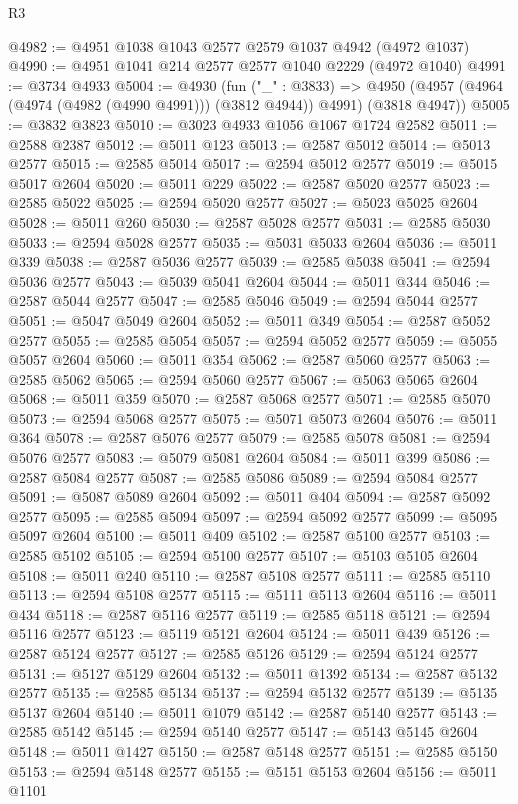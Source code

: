 \begin{lexlean}{R3}
\begin{coremodule}
@4982 := @4951 @1038 @1043 @2577 @2579 @1037 @4942 (@4972 @1037)
@4990 := @4951 @1041 @214 @2577 @2577 @1040 @2229 (@4972 @1040)
@4991 := @3734 @4933
@5004 := @4930
    (fun ("_" : @3833) =>
    @4950 (@4957 (@4964 (@4974 (@4982 (@4990 @4991))) (@3812 @4944)) @4991) (@3818 @4947))
@5005 := @3832 @3823
@5010 := @3023 @4933 @1056 @1067 @1724 @2582
@5011 := @2588 @2387
@5012 := @5011 @123
@5013 := @2587 @5012
@5014 := @5013 @2577
@5015 := @2585 @5014
@5017 := @2594 @5012 @2577
@5019 := @5015 @5017 @2604
@5020 := @5011 @229
@5022 := @2587 @5020 @2577
@5023 := @2585 @5022
@5025 := @2594 @5020 @2577
@5027 := @5023 @5025 @2604
@5028 := @5011 @260
@5030 := @2587 @5028 @2577
@5031 := @2585 @5030
@5033 := @2594 @5028 @2577
@5035 := @5031 @5033 @2604
@5036 := @5011 @339
@5038 := @2587 @5036 @2577
@5039 := @2585 @5038
@5041 := @2594 @5036 @2577
@5043 := @5039 @5041 @2604
@5044 := @5011 @344
@5046 := @2587 @5044 @2577
@5047 := @2585 @5046
@5049 := @2594 @5044 @2577
@5051 := @5047 @5049 @2604
@5052 := @5011 @349
@5054 := @2587 @5052 @2577
@5055 := @2585 @5054
@5057 := @2594 @5052 @2577
@5059 := @5055 @5057 @2604
@5060 := @5011 @354
@5062 := @2587 @5060 @2577
@5063 := @2585 @5062
@5065 := @2594 @5060 @2577
@5067 := @5063 @5065 @2604
@5068 := @5011 @359
@5070 := @2587 @5068 @2577
@5071 := @2585 @5070
@5073 := @2594 @5068 @2577
@5075 := @5071 @5073 @2604
@5076 := @5011 @364
@5078 := @2587 @5076 @2577
@5079 := @2585 @5078
@5081 := @2594 @5076 @2577
@5083 := @5079 @5081 @2604
@5084 := @5011 @399
@5086 := @2587 @5084 @2577
@5087 := @2585 @5086
@5089 := @2594 @5084 @2577
@5091 := @5087 @5089 @2604
@5092 := @5011 @404
@5094 := @2587 @5092 @2577
@5095 := @2585 @5094
@5097 := @2594 @5092 @2577
@5099 := @5095 @5097 @2604
@5100 := @5011 @409
@5102 := @2587 @5100 @2577
@5103 := @2585 @5102
@5105 := @2594 @5100 @2577
@5107 := @5103 @5105 @2604
@5108 := @5011 @240
@5110 := @2587 @5108 @2577
@5111 := @2585 @5110
@5113 := @2594 @5108 @2577
@5115 := @5111 @5113 @2604
@5116 := @5011 @434
@5118 := @2587 @5116 @2577
@5119 := @2585 @5118
@5121 := @2594 @5116 @2577
@5123 := @5119 @5121 @2604
@5124 := @5011 @439
@5126 := @2587 @5124 @2577
@5127 := @2585 @5126
@5129 := @2594 @5124 @2577
@5131 := @5127 @5129 @2604
@5132 := @5011 @1392
@5134 := @2587 @5132 @2577
@5135 := @2585 @5134
@5137 := @2594 @5132 @2577
@5139 := @5135 @5137 @2604
@5140 := @5011 @1079
@5142 := @2587 @5140 @2577
@5143 := @2585 @5142
@5145 := @2594 @5140 @2577
@5147 := @5143 @5145 @2604
@5148 := @5011 @1427
@5150 := @2587 @5148 @2577
@5151 := @2585 @5150
@5153 := @2594 @5148 @2577
@5155 := @5151 @5153 @2604
@5156 := @5011 @1101

\end{coremodule}
\end{lexlean}
